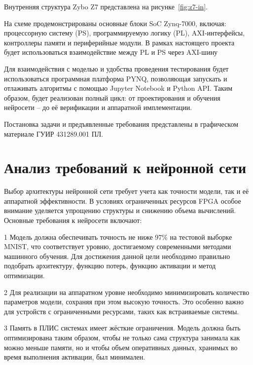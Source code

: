 
Внутренняя структура Zybo Z7 представлена на рисунке~\ref{fig:z7-in}.


На схеме продемонстрированы основные блоки SoC Zynq-7000, включая: процессорную 
систему (PS), программируемую логику (PL), AXI-интерфейсы, контроллеры памяти и 
периферийные модули. В рамках настоящего проекта будет использоваться 
взаимодействие между PL и PS через AXI-шину

Для взаимодействия с моделью и удобства проведения тестирования будет 
использоваться программная платформа PYNQ, позволяющая запускать и отлаживать 
алгоритмы с помощью Jupyter Notebook и Python API. Таким образом, будет 
реализован полный цикл: от проектирования и обучения нейросети – до её 
верификации и аппаратной имплементации.

Постановка задачи и предъявленные требования представлены в графическом 
материале ГУИР 431289.001 ПЛ.

\section{Анализ требований к нейронной сети}
\hspace*{12.5 mm}Выбор архитектуры нейронной сети требует учета как точности 
модели, так и её аппаратной эффективности. В условиях ограниченных ресурсов 
FPGA особое внимание уделяется упрощению структуры и снижению объема 
вычислений. Основные требования к нейросети включают:

  1 Модель должна обеспечивать точность не ниже 97\% на тестовой выборке MNIST, 
что соответствует уровню, достигаемому современными методами машинного 
обучения. Для достижения данной цели необходимо правильно подобрать 
архитектуру, функцию потерь, функцию активации и метод оптимизации.

  2 Для реализации на аппаратном уровне необходимо минимизировать количество 
параметров модели, сохраняя при этом высокую точность. Это особенно важно для 
устройств с ограниченными ресурсами, таких как встраиваемые системы.

  3 Память в ПЛИС системах имеет жёсткие ограничения. Модель должна быть 
оптимизирована таким образом, чтобы не только сама структура занимала как можно 
меньше памяти, но и чтобы объем оперативных данных, хранимых во время выполнения 
активации, был минимален.

